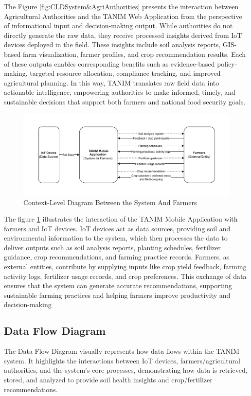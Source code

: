 {	The Figure \ref{fig:CLDSystem&AgriAuthorities} presents the interaction between Agricultural Authorities and the TANIM Web 	Application from the perspective of informational input and decision-making output. While authorities do not directly generate the raw data, they receive processed insights derived from IoT devices deployed in the field. These insights include soil analysis reports, GIS-based farm visualization, farmer profiles, and crop recommendation results. Each of these outputs enables corresponding benefits such as evidence-based policy-making, targeted resource allocation, compliance tracking, and improved agricultural planning. In this way, TANIM translates raw field data into actionable intelligence, empowering authorities to make informed, timely, and sustainable decisions that support both farmers and national food security goals.
	
	\begin{figure}[H]
		\centering
		\caption{Context-Level Diagram Between the System And Farmers}
		\label{fig:CLDSystem&Farmers}
		\includegraphics[width=1\textwidth]{figures/cldMOB.pdf}
	\end{figure}
	
	The figure \ref{fig:CLDSystem&Farmers} illustrates the interaction of the TANIM Mobile Application with farmers and IoT devices. IoT devices act as data sources, providing soil and environmental information to the system, which then processes the data to deliver outputs such as soil analysis reports, planting schedules, fertilizer guidance, crop recommendations, and farming practice records. Farmers, as external entities, contribute by supplying inputs like crop yield feedback, farming activity logs, fertilizer usage records, and crop preferences. This exchange of data ensures that the system can generate accurate recommendations, supporting sustainable farming practices and helping farmers improve productivity and decision-making
	
	\subsection{Data Flow Diagram}
	The Data Flow Diagram visually represents how data flows within the TANIM system. It highlights the interactions between IoT devices, farmers/agricultural authorities, and the system’s core processes, demonstrating how data is retrieved, stored, and analyzed to provide soil health insights and crop/fertilizer recommendations.
	
}
